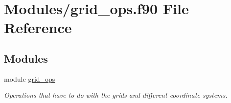 \hypertarget{grid__ops_8f90}{}\section{Modules/grid\+\_\+ops.f90 File Reference}
\label{grid__ops_8f90}
\subsection*{Modules}
\begin{DoxyCompactItemize}
\item 
module \hyperlink{namespacegrid__ops}{grid\+\_\+ops}
\begin{DoxyCompactList}\small\item\em Operations that have to do with the grids and different coordinate systems. \end{DoxyCompactList}\end{DoxyCompactItemize}
